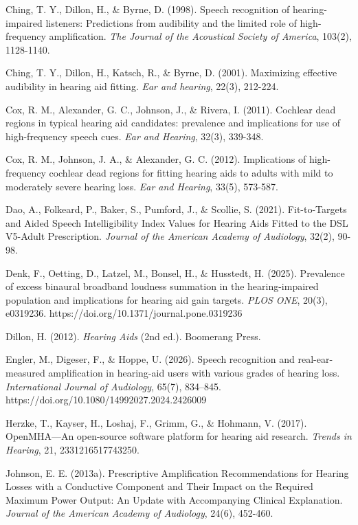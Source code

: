 \documentclass[
  12pt,
]{article}
\begin{document}
Ching, T. Y., Dillon, H., \& Byrne, D. (1998). Speech recognition of
hearing-impaired listeners: Predictions from audibility and the limited
role of high-frequency amplification. \emph{The Journal of the
Acoustical Society of America}, 103(2), 1128-1140.

Ching, T. Y., Dillon, H., Katsch, R., \& Byrne, D. (2001). Maximizing
effective audibility in hearing aid fitting. \emph{Ear and hearing},
22(3), 212-224.

Cox, R. M., Alexander, G. C., Johnson, J., \& Rivera, I. (2011).
Cochlear dead regions in typical hearing aid candidates: prevalence and
implications for use of high-frequency speech cues. \emph{Ear and
Hearing}, 32(3), 339-348.

Cox, R. M., Johnson, J. A., \& Alexander, G. C. (2012). Implications of
high-frequency cochlear dead regions for fitting hearing aids to adults
with mild to moderately severe hearing loss. \emph{Ear and Hearing},
33(5), 573-587.

Dao, A., Folkeard, P., Baker, S., Pumford, J., \& Scollie, S. (2021).
Fit-to-Targets and Aided Speech Intelligibility Index Values for Hearing
Aids Fitted to the DSL V5-Adult Prescription. \emph{Journal of the
American Academy of Audiology}, 32(2), 90-98.

Denk, F., Oetting, D., Latzel, M., Bonsel, H., \& Husstedt, H. (2025).
Prevalence of excess binaural broadband loudness summation in the
hearing-impaired population and implications for hearing aid gain
targets. \emph{PLOS ONE}, 20(3), e0319236.
https://doi.org/10.1371/journal.pone.0319236

Dillon, H. (2012). \emph{Hearing Aids} (2nd ed.). Boomerang Press.

Engler, M., Digeser, F., \& Hoppe, U. (2026). Speech recognition and
real-ear-measured amplification in hearing-aid users with various grades
of hearing loss. \emph{International Journal of Audiology}, 65(7),
834--845. https://doi.org/10.1080/14992027.2024.2426009

Herzke, T., Kayser, H., Loshaj, F., Grimm, G., \& Hohmann, V. (2017).
OpenMHA---An open-source software platform for hearing aid research.
\emph{Trends in Hearing}, 21, 2331216517743250.

Johnson, E. E. (2013a). Prescriptive Amplification Recommendations for
Hearing Losses with a Conductive Component and Their Impact on the
Required Maximum Power Output: An Update with Accompanying Clinical
Explanation. \emph{Journal of the American Academy of Audiology}, 24(6),
452-460.
\end{document}

